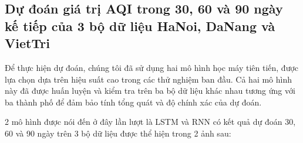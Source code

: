 \documentclass[conference]{IEEEtran}
\begin{document}
\subsection{Dự đoán giá trị AQI trong 30, 60 và 90 ngày kế tiếp của 3 bộ dữ liệu HaNoi, DaNang và VietTri}
Để thực hiện dự đoán, chúng tôi đã sử dụng hai mô hình học máy tiên tiến, được lựa chọn dựa trên hiệu suất cao trong các thử nghiệm ban đầu. Cả hai mô hình này đã được huấn luyện và kiểm tra trên ba bộ dữ liệu khác nhau tương ứng với ba thành phố để đảm bảo tính tổng quát và độ chính xác của dự đoán.

2 mô  hình được nói đến ở đây lần lượt là LSTM và RNN có kết quả dự đoán 30, 60 và 90 ngày trên 3 bộ dữ liệu được thể hiện trong 2 ảnh sau:

\begin{figure}[h]
    \centering
\end{figure}
\end{document}
